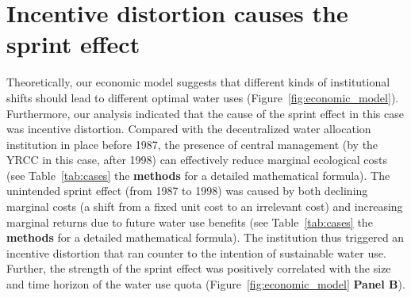 \documentclass{article}
\begin{document}
\section{Incentive distortion causes the sprint effect}
Theoretically, our economic model suggests that different kinds of institutional shifts should lead to different optimal water uses (Figure~\ref{fig:economic_model}).
Furthermore, our analysis indicated that the cause of the sprint effect in this case was incentive distortion.
Compared with the decentralized water allocation institution in place before 1987, the presence of central management (by the YRCC in this case, after 1998) can effectively reduce marginal ecological costs (see Table~\ref{tab:cases} the \textbf{methods} for a detailed mathematical formula).
The unintended sprint effect (from 1987 to 1998) was caused by both declining marginal costs (a shift from a fixed unit cost to an irrelevant cost) and increasing marginal returns due to future water use benefits (see Table~\ref{tab:cases} the \textbf{methods} for a detailed mathematical formula).
The institution thus triggered an incentive distortion that ran counter to the intention of sustainable water use. Further, the strength of the sprint effect was positively correlated with the size and time horizon of the water use quota (Figure~\ref{fig:economic_model} \textbf{Panel B}).
\end{document}
